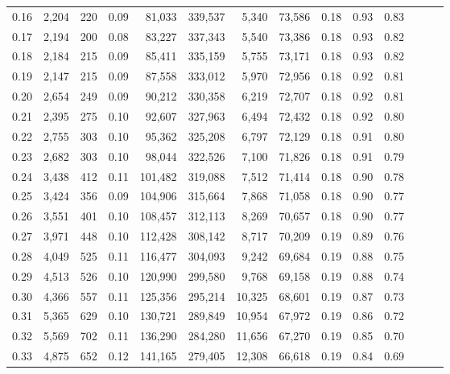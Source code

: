 \begin{tabular}{rrrrrrrrrrrrrr}
0.16 &   2,204 &    220 &  0.09 &   81,033 &  339,537 &   5,340 &  73,586 &  0.18 &  0.93 &      0.83 \\
0.17 &   2,194 &    200 &  0.08 &   83,227 &  337,343 &   5,540 &  73,386 &  0.18 &  0.93 &      0.82 \\
0.18 &   2,184 &    215 &  0.09 &   85,411 &  335,159 &   5,755 &  73,171 &  0.18 &  0.93 &      0.82 \\
0.19 &   2,147 &    215 &  0.09 &   87,558 &  333,012 &   5,970 &  72,956 &  0.18 &  0.92 &      0.81 \\
0.20 &   2,654 &    249 &  0.09 &   90,212 &  330,358 &   6,219 &  72,707 &  0.18 &  0.92 &      0.81 \\
0.21 &   2,395 &    275 &  0.10 &   92,607 &  327,963 &   6,494 &  72,432 &  0.18 &  0.92 &      0.80 \\
0.22 &   2,755 &    303 &  0.10 &   95,362 &  325,208 &   6,797 &  72,129 &  0.18 &  0.91 &      0.80 \\
0.23 &   2,682 &    303 &  0.10 &   98,044 &  322,526 &   7,100 &  71,826 &  0.18 &  0.91 &      0.79 \\
0.24 &   3,438 &    412 &  0.11 &  101,482 &  319,088 &   7,512 &  71,414 &  0.18 &  0.90 &      0.78 \\
0.25 &   3,424 &    356 &  0.09 &  104,906 &  315,664 &   7,868 &  71,058 &  0.18 &  0.90 &      0.77 \\
0.26 &   3,551 &    401 &  0.10 &  108,457 &  312,113 &   8,269 &  70,657 &  0.18 &  0.90 &      0.77 \\
0.27 &   3,971 &    448 &  0.10 &  112,428 &  308,142 &   8,717 &  70,209 &  0.19 &  0.89 &      0.76 \\
0.28 &   4,049 &    525 &  0.11 &  116,477 &  304,093 &   9,242 &  69,684 &  0.19 &  0.88 &      0.75 \\
0.29 &   4,513 &    526 &  0.10 &  120,990 &  299,580 &   9,768 &  69,158 &  0.19 &  0.88 &      0.74 \\
0.30 &   4,366 &    557 &  0.11 &  125,356 &  295,214 &  10,325 &  68,601 &  0.19 &  0.87 &      0.73 \\
0.31 &   5,365 &    629 &  0.10 &  130,721 &  289,849 &  10,954 &  67,972 &  0.19 &  0.86 &      0.72 \\
0.32 &   5,569 &    702 &  0.11 &  136,290 &  284,280 &  11,656 &  67,270 &  0.19 &  0.85 &      0.70 \\
0.33 &   4,875 &    652 &  0.12 &  141,165 &  279,405 &  12,308 &  66,618 &  0.19 &  0.84 &      0.69 \\

\end{tabular}
